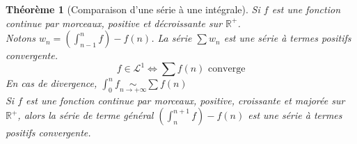 \documentclass[11pt,a4paper]{report}
\newtheorem{itheorem}[theorem]{Théorème}
\theoremstyle{definition}
\begin{document}
\begin{itheorem}[Comparaison d'une série à une intégrale]
    Si $f$ est une fonction continue par morceaux, \emph{positive} et \emph{décroissante}  sur $\ensuremath{\mathbb{R}}^+$.\\
    Notons $w_n = \left( \int_{n-1}^n f \right) - f(n)$. La série $\sum w_n$ est une série à termes positifs convergente.\\
    \begin{equation}
        f \in \mathcal{L}^1 \Leftrightarrow \sum f(n) \text{ converge}
    \end{equation}
    En cas de divergence, $\int_0^{n} f \underset{n \to +\infty}{\sim}\sum f(n)$\\[\baselineskip]

    Si $f$ est une fonction continue par morceaux, \emph{positive}, \emph{croissante} et \textcolor{couleurImp}{\emph{majorée}} sur $\ensuremath{\mathbb{R}}^+$, alors la série de terme général $\left( \int_n^{n+1} f \right) - f(n)$ est une série à termes positifs convergente.
\end{itheorem}

\end{document}
